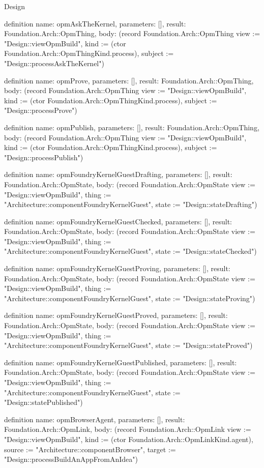 \begin{lexlean}{Design}
\begin{semanticmodule}
definition{
  name: opmAskTheKernel,
  parameters: [],
  result: Foundation.Arch::OpmThing,
  body: (record Foundation.Arch::OpmThing {view := "Design::viewOpmBuild", kind := (ctor Foundation.Arch::OpmThingKind.process), subject := "Design::processAskTheKernel"})
}

definition{
  name: opmProve,
  parameters: [],
  result: Foundation.Arch::OpmThing,
  body: (record Foundation.Arch::OpmThing {view := "Design::viewOpmBuild", kind := (ctor Foundation.Arch::OpmThingKind.process), subject := "Design::processProve"})
}

definition{
  name: opmPublish,
  parameters: [],
  result: Foundation.Arch::OpmThing,
  body: (record Foundation.Arch::OpmThing {view := "Design::viewOpmBuild", kind := (ctor Foundation.Arch::OpmThingKind.process), subject := "Design::processPublish"})
}

definition{
  name: opmFoundryKernelGuestDrafting,
  parameters: [],
  result: Foundation.Arch::OpmState,
  body: (record Foundation.Arch::OpmState {view := "Design::viewOpmBuild", thing := "Architecture::componentFoundryKernelGuest", state := "Design::stateDrafting"})
}

definition{
  name: opmFoundryKernelGuestChecked,
  parameters: [],
  result: Foundation.Arch::OpmState,
  body: (record Foundation.Arch::OpmState {view := "Design::viewOpmBuild", thing := "Architecture::componentFoundryKernelGuest", state := "Design::stateChecked"})
}

definition{
  name: opmFoundryKernelGuestProving,
  parameters: [],
  result: Foundation.Arch::OpmState,
  body: (record Foundation.Arch::OpmState {view := "Design::viewOpmBuild", thing := "Architecture::componentFoundryKernelGuest", state := "Design::stateProving"})
}

definition{
  name: opmFoundryKernelGuestProved,
  parameters: [],
  result: Foundation.Arch::OpmState,
  body: (record Foundation.Arch::OpmState {view := "Design::viewOpmBuild", thing := "Architecture::componentFoundryKernelGuest", state := "Design::stateProved"})
}

definition{
  name: opmFoundryKernelGuestPublished,
  parameters: [],
  result: Foundation.Arch::OpmState,
  body: (record Foundation.Arch::OpmState {view := "Design::viewOpmBuild", thing := "Architecture::componentFoundryKernelGuest", state := "Design::statePublished"})
}

definition{
  name: opmBrowserAgent,
  parameters: [],
  result: Foundation.Arch::OpmLink,
  body: (record Foundation.Arch::OpmLink {view := "Design::viewOpmBuild", kind := (ctor Foundation.Arch::OpmLinkKind.agent), source := "Architecture::componentBrowser", target := "Design::processBuildAnAppFromAnIdea"})
}


\end{semanticmodule}
\end{lexlean}

